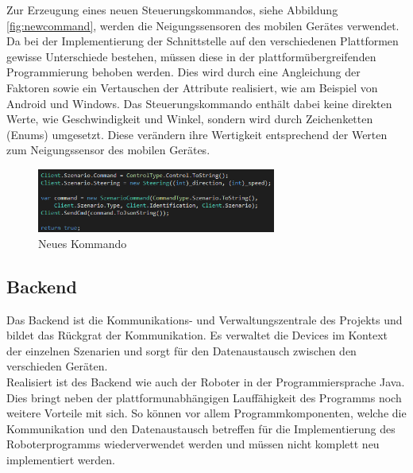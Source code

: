 \noindent
Zur Erzeugung eines neuen Steuerungskommandos, siehe Abbildung \eqref{fig:newcommand}, werden die Neigungssensoren des mobilen Gerätes verwendet. Da bei der Implementierung der Schnittstelle auf den verschiedenen Plattformen gewisse Unterschiede bestehen, müssen diese in der plattformübergreifenden Programmierung behoben werden. Dies wird durch eine Angleichung der Faktoren sowie ein Vertauschen der Attribute realisiert, wie am Beispiel von Android und Windows. Das Steuerungskommando enthält dabei keine direkten Werte, wie Geschwindigkeit und Winkel, sondern wird durch Zeichenketten (Enums) umgesetzt. Diese verändern ihre Wertigkeit entsprechend der Werten zum Neigungssensor des mobilen Gerätes.

\begin{figure}[h]
	\begin{center}
		\includegraphics[width=0.7\textwidth]{images/implementation/newcommand.png}
	\end{center}	
	\caption{Neues Kommando}
	\label{fig:newcommand}
\end{figure}

\newpage
\subsection{Backend}
Das Backend ist die Kommunikations- und Verwaltungszentrale des Projekts und bildet das Rückgrat der Kommunikation. Es verwaltet die 
Devices im Kontext der einzelnen Szenarien und sorgt für den Datenaustausch zwischen den verschieden Geräten. \\
Realisiert ist des Backend wie auch der Roboter in der Programmiersprache Java. Dies bringt neben der plattformunabhängigen 
Lauffähigkeit des Programms noch weitere Vorteile mit sich. So können vor allem Programmkomponenten, welche die Kommunikation und
den Datenaustausch betreffen für die Implementierung des Roboterprogramms wiederverwendet werden und müssen nicht komplett neu
implementiert werden.
